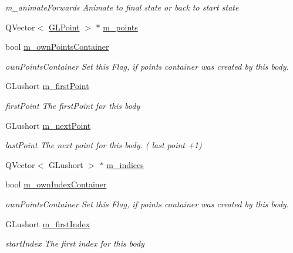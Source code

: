 \begin{DoxyCompactItemize}
\begin{DoxyCompactList}\small\item\em m\+\_\+animate\+Forwards Animate to final state or back to start state \end{DoxyCompactList}\item 
Q\+Vector$<$ \mbox{\hyperlink{class_g_l_point}{G\+L\+Point}} $>$ $\ast$ \mbox{\hyperlink{class_g_l_body_a8e157d4bf676d1c5af7f74d30d44ea12}{m\+\_\+points}}
\item 
bool \mbox{\hyperlink{class_g_l_body_afd41dccec396a5d5bc0d7deb004390c0}{m\+\_\+own\+Points\+Container}}
\begin{DoxyCompactList}\small\item\em own\+Points\+Container Set this Flag, if points container was created by this body. \end{DoxyCompactList}\item 
G\+Lushort \mbox{\hyperlink{class_g_l_body_abaf51ac1970735fdc27e861e0276d059}{m\+\_\+first\+Point}}
\begin{DoxyCompactList}\small\item\em first\+Point The first\+Point for this body \end{DoxyCompactList}\item 
G\+Lushort \mbox{\hyperlink{class_g_l_body_ad23169cadd57fa23a035c50749974eaa}{m\+\_\+next\+Point}}
\begin{DoxyCompactList}\small\item\em last\+Point The next point for this body. ( last point +1) \end{DoxyCompactList}\item 
Q\+Vector$<$ G\+Lushort $>$ $\ast$ \mbox{\hyperlink{class_g_l_body_a0ac1c7cdd34662989db4204735f05aca}{m\+\_\+indices}}
\item 
bool \mbox{\hyperlink{class_g_l_body_af55a5779ab18630e90686d6e3104b932}{m\+\_\+own\+Index\+Container}}
\begin{DoxyCompactList}\small\item\em own\+Points\+Container Set this Flag, if points container was created by this body. \end{DoxyCompactList}\item 
G\+Lushort \mbox{\hyperlink{class_g_l_body_a8274ed0febea3f7b3e1a4e2ac8c49314}{m\+\_\+first\+Index}}
\begin{DoxyCompactList}\small\item\em start\+Index The first index for this body \end{DoxyCompactList}\item 

\end{DoxyCompactItemize}
